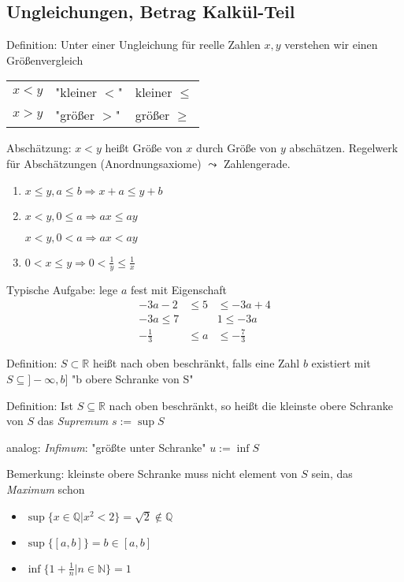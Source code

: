 \documentclass[a4paper,10pt]{book}
\begin{document}
\subsection{Ungleichungen,  Betrag Kalkül-Teil}
Definition: Unter einer Ungleichung für reelle Zahlen $x,y$ verstehen wir einen Größenvergleich
\begin{center}
\begin{tabular}{lll}
$x<y$ & "kleiner $<$" & kleiner $\leq$ \\ 
$x>y$ & "größer $>$" & größer $\geq$
\end{tabular}
\end{center}

Abschätzung: $x<y$ heißt Größe von $x$ durch Größe von $y$ abschätzen. Regelwerk für Abschätzungen (Anordnungsaxiome)
$\leadsto$ Zahlengerade.
\begin{enumerate}
 \item $x \leq y, a\leq b \Rightarrow x+a \leq y+b$
 \item $x<y, 0 \leq a \Rightarrow ax \leq ay$
 
$x<y, 0 < a \Rightarrow ax < ay$
 \item $0<x\leq y \Rightarrow 0 < \frac{1}{y} \leq \frac{1}{x}$
\end{enumerate}
Typische Aufgabe:
lege $a$ fest mit Eigenschaft
\begin{align*}
-3a-2 &\leq 5 &\leq -3a+4 \\
-3a\leq 7 & & 1 \leq -3a \\
-\frac{1}{3} &\leq a &\leq -\frac{7}{3}
\end{align*}

Definition: $S \subset \mathbb{R}$ heißt nach oben beschränkt, falls eine Zahl $b$ existiert mit $S\subseteq ]-\infty,b]$ "b obere Schranke von S"

Definition: Ist $S \subseteq \mathbb{R}$ nach oben beschränkt, so heißt die kleinste obere Schranke von $S$ das \emph{Supremum} $s:=\sup S$

analog: \emph{Infimum}: "größte unter Schranke" $u := \inf S$

Bemerkung: kleinste obere Schranke muss nicht element von $S$ sein, das \emph{Maximum} schon

\begin{itemize}
 \item $\sup \{x \in \mathbb{Q} | x^2 < 2 \} = \sqrt{2} \notin \mathbb{Q}$
 \item $\sup \{[a,b]\} = b \in [a,b]$
 \item $\inf \{ 1+\frac{1}{n}|n\in \mathbb{N}\} = 1$
\end{itemize}
\end{document}
